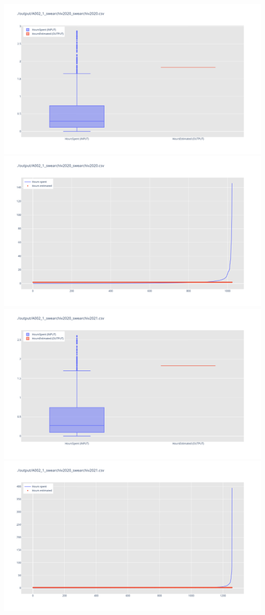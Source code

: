 \includegraphics[width=\textwidth]{Scripts/output/A002_1_swearchiv2020_swearchiv2020.csv.png}
\includegraphics[width=\textwidth]{Scripts/output/A002_1_swearchiv2020_swearchiv2020.csv.scatter.png}
\includegraphics[width=\textwidth]{Scripts/output/A002_1_swearchiv2020_swearchiv2021.csv.png}
\includegraphics[width=\textwidth]{Scripts/output/A002_1_swearchiv2020_swearchiv2021.csv.scatter.png}
